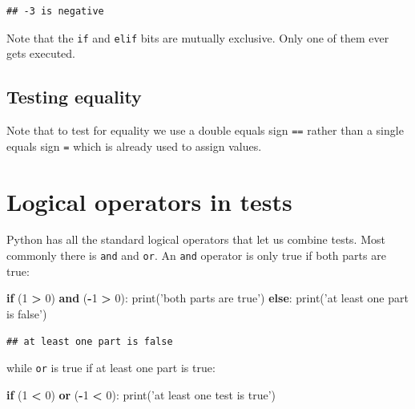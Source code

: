 \documentclass[]{book}
\newenvironment{Shaded}{\begin{snugshade}}{\end{snugshade}}
\newcommand{\BuiltInTok}[1]{#1}
\newcommand{\ControlFlowTok}[1]{\textcolor[rgb]{0.13,0.29,0.53}{\textbf{#1}}}
\newcommand{\DecValTok}[1]{\textcolor[rgb]{0.00,0.00,0.81}{#1}}
\newcommand{\KeywordTok}[1]{\textcolor[rgb]{0.13,0.29,0.53}{\textbf{#1}}}
\newcommand{\NormalTok}[1]{#1}
\newcommand{\OperatorTok}[1]{\textcolor[rgb]{0.81,0.36,0.00}{\textbf{#1}}}
\newcommand{\StringTok}[1]{\textcolor[rgb]{0.31,0.60,0.02}{#1}}
\theoremstyle{definition}
\theoremstyle{definition}
\theoremstyle{definition}
\theoremstyle{remark}
\begin{document}
\begin{verbatim}
## -3 is negative
\end{verbatim}

Note that the \texttt{if} and \texttt{elif} bits are mutually exclusive.
Only one of them ever gets executed.

\hypertarget{testing-equality}{%
\subsection{Testing equality}\label{testing-equality}}

Note that to test for equality we use a double equals sign \texttt{==}
rather than a single equals sign \texttt{=} which is already used to
assign values.

\hypertarget{logical-operators-in-tests}{%
\section{Logical operators in tests}\label{logical-operators-in-tests}}

Python has all the standard logical operators that let us combine tests.
Most commonly there is \texttt{and} and \texttt{or}. An \texttt{and}
operator is only true if both parts are true:

\begin{Shaded}
\begin{Highlighting}[]
\ControlFlowTok{if}\NormalTok{ (}\DecValTok{1} \OperatorTok{>} \DecValTok{0}\NormalTok{) }\KeywordTok{and}\NormalTok{ (}\OperatorTok{-}\DecValTok{1} \OperatorTok{>} \DecValTok{0}\NormalTok{):}
    \BuiltInTok{print}\NormalTok{(}\StringTok{'both parts are true'}\NormalTok{)}
\ControlFlowTok{else}\NormalTok{:}
    \BuiltInTok{print}\NormalTok{(}\StringTok{'at least one part is false'}\NormalTok{)}
\end{Highlighting}
\end{Shaded}

\begin{verbatim}
## at least one part is false
\end{verbatim}

while \texttt{or} is true if at least one part is true:

\begin{Shaded}
\begin{Highlighting}[]
\ControlFlowTok{if}\NormalTok{ (}\DecValTok{1} \OperatorTok{<} \DecValTok{0}\NormalTok{) }\KeywordTok{or}\NormalTok{ (}\OperatorTok{-}\DecValTok{1} \OperatorTok{<} \DecValTok{0}\NormalTok{):}
    \BuiltInTok{print}\NormalTok{(}\StringTok{'at least one test is true'}\NormalTok{)}
\end{Highlighting}
\end{Shaded}
\end{document}
